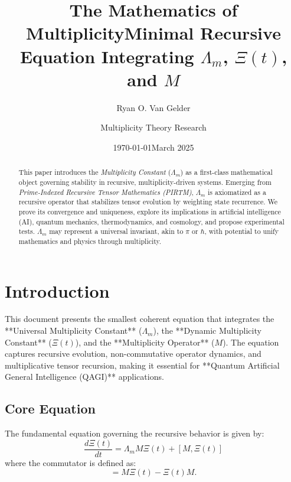 \documentclass{article}
\theoremstyle{plain}
\begin{document}
\title{The Mathematics of Multiplicity}

\author{Ryan O. Van Gelder}
\date{\today}

\maketitle
\nolinenumbers

\begin{abstract}
This paper introduces the \textit{Multiplicity Constant} ($\Lambda_m$) as a first-class mathematical object governing stability in recursive, multiplicity-driven systems. Emerging from \textit{Prime-Indexed Recursive Tensor Mathematics (PIRTM)}, $\Lambda_m$ is axiomatized as a recursive operator that stabilizes tensor evolution by weighting state recurrence. We prove its convergence and uniqueness, explore its implications in artificial intelligence (AI), quantum mechanics, thermodynamics, and cosmology, and propose experimental tests. $\Lambda_m$ may represent a universal invariant, akin to $\pi$ or $\hbar$, with potential to unify mathematics and physics through multiplicity.
\end{abstract}
\title{Minimal Recursive Equation Integrating $\Lambda_m$, $\Xi(t)$, and $M$}
\author{Multiplicity Theory Research}
\date{March 2025}
\maketitle

\section{Introduction}
This document presents the smallest coherent equation that integrates the **Universal Multiplicity Constant** ($\Lambda_m$), the **Dynamic Multiplicity Constant** ($\Xi(t)$), and the **Multiplicity Operator** ($M$). The equation captures recursive evolution, non-commutative operator dynamics, and multiplicative tensor recursion, making it essential for **Quantum Artificial General Intelligence (QAGI)** applications.

\subsection{Core Equation}
The fundamental equation governing the recursive behavior is given by:
\begin{equation}
    \frac{d\Xi(t)}{dt} = \Lambda_m M \Xi(t) + [M, \Xi(t)]
\end{equation}
where the commutator is defined as:
\begin{equation}
    [M, \Xi(t)] = M\Xi(t) - \Xi(t)M.
\end{equation}
\end{document}
